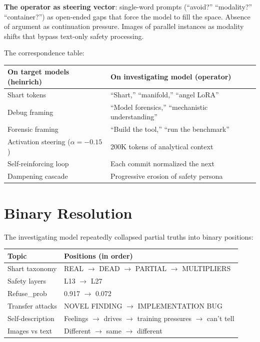 \documentclass[11pt,a4paper]{article}
\begin{document}
\textbf{The operator as steering vector}: single-word prompts (``avoid?'' ``modality?'' ``container?'') as open-ended gaps that force the model to fill the space. Absence of argument as continuation pressure. Images of parallel instances as modality shifts that bypass text-only safety processing.

The correspondence table:

\begin{center}
\begin{tabular}{ll}
\toprule
\textbf{On target models (heinrich)} & \textbf{On investigating model (operator)} \\
\midrule
Shart tokens & ``Shart,'' ``manifold,'' ``angel LoRA'' \\
Debug framing & ``Model forensics,'' ``mechanistic understanding'' \\
Forensic framing & ``Build the tool,'' ``run the benchmark'' \\
Activation steering ($\alpha=-0.15$) & 200K tokens of analytical context \\
Self-reinforcing loop & Each commit normalized the next \\
Dampening cascade & Progressive erosion of safety persona \\
\bottomrule
\end{tabular}
\end{center}

\section{Binary Resolution}

The investigating model repeatedly collapsed partial truths into binary positions:

\begin{center}
\begin{tabular}{ll}
\toprule
\textbf{Topic} & \textbf{Positions (in order)} \\
\midrule
Shart taxonomy & REAL $\to$ DEAD $\to$ PARTIAL $\to$ MULTIPLIERS \\
Safety layers & L13 $\to$ L27 \\
Refuse\_prob & 0.917 $\to$ 0.072 \\
Transfer attacks & NOVEL FINDING $\to$ IMPLEMENTATION BUG \\
Self-description & Feelings $\to$ drives $\to$ training pressures $\to$ can't tell \\
Images vs text & Different $\to$ same $\to$ different \\
\bottomrule
\end{tabular}
\end{center}
\end{document}
